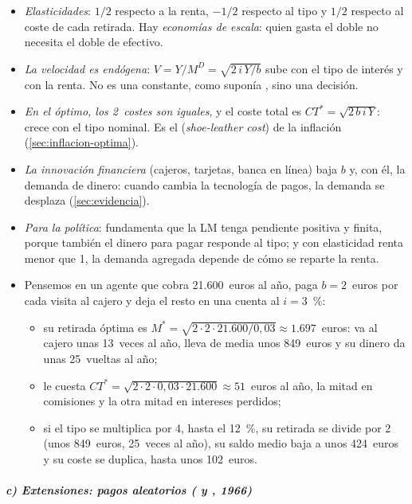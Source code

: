 \documentclass[11pt]{article}
\begin{document}
\begin{itemize}
\item \emph{Elasticidades}: $1/2$ respecto a la renta, $-1/2$ respecto al tipo y $1/2$ respecto al coste de cada retirada. Hay \emph{economías de escala}: quien gasta el doble no necesita el doble de efectivo.
\item \emph{La velocidad es endógena}: $V=Y/M^D=\sqrt{2\,i\,Y/b}$ sube con el tipo de interés y con la renta. No es una constante, como suponía , sino una decisión.
\item \emph{En el óptimo, los 2~costes son iguales}, y el coste total es $CT^*=\sqrt{2\,b\,i\,Y}$: crece con el tipo nominal. Es el  (\emph{shoe-leather cost}) de la inflación (\ref{sec:inflacion-optima}).
\item \emph{La innovación financiera} (cajeros, tarjetas, banca en línea) baja $b$ y, con él, la demanda de dinero: cuando cambia la tecnología de pagos, la demanda se desplaza (\ref{sec:evidencia}).
\item \emph{Para la política}: fundamenta que la LM tenga pendiente positiva y finita, porque también el dinero para pagar responde al tipo; y con elasticidad renta menor que 1, la demanda agregada depende de cómo se reparte la renta.
\item Pensemos en un agente que cobra 21.600~euros al año, paga $b=2$~euros por cada visita al cajero y deja el resto en una cuenta al $i=3$~\%:
  \begin{itemize}
  \item su retirada óptima es $M^*=\sqrt{2\cdot 2\cdot 21.600/0{,}03}\approx 1.697$~euros: va al cajero unas 13~veces al año, lleva de media unos 849~euros y su dinero da unas 25~vueltas al año;
  \item le cuesta $CT^*=\sqrt{2\cdot 2\cdot 0{,}03\cdot 21.600}\approx 51$~euros al año, la mitad en comisiones y la otra mitad en intereses perdidos;
  \item si el tipo se multiplica por 4, hasta el 12~\%, su retirada se divide por 2 (unos 849~euros, 25~veces al año), su saldo medio baja a unos 424~euros y su coste se duplica, hasta unos 102~euros.
  \end{itemize}
\end{itemize}

\subparagraph{c) Extensiones: pagos aleatorios ( y , 1966)}
\end{document}
